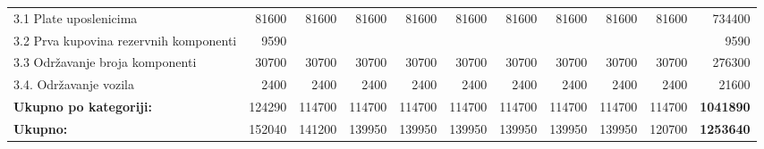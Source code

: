 \documentclass[12pt]{article}
\begin{document}
\begin{landscape}
\begin{table}[htbp]
\begin{tabular}{lrrrrrrrrrr}
    3.1 Plate uposlenicima & 81600 & 81600 & 81600 & 81600 & 81600 & 81600 & 81600 & 81600 & 81600 & 734400 \\
    \multicolumn{1}{p{14.715em}}{3.2 Prva kupovina rezervnih\newline{} komponenti} & 9590  &       &       &       &       &       &       &       &       & 9590 \\
    3.3 Održavanje broja komponenti & 30700 & 30700 & 30700 & 30700 & 30700 & 30700 & 30700 & 30700 & 30700 & 276300 \\
    3.4. Održavanje vozila & 2400  & 2400  & 2400  & 2400  & 2400  & 2400  & 2400  & 2400  & 2400  & 21600 \\
    \midrule
    \textbf{Ukupno po kategoriji:} & 124290 & 114700 & 114700 & 114700 & 114700 & 114700 & 114700 & 114700 & 114700 & \textbf{1041890} \\
    \midrule
    \textbf{Ukupno:} & 152040 & 141200 & 139950 & 139950 & 139950 & 139950 & 139950 & 139950 & 120700 & \textbf{1253640} \\
    \bottomrule
    \end{tabular}%
  \label{tab:addlabel}%
\end{table}%

\end{landscape}
\end{document}
